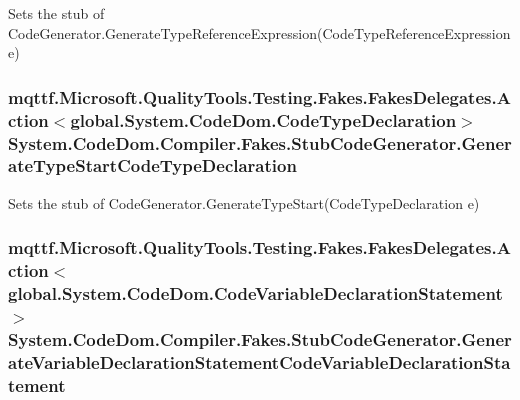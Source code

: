 Sets the stub of Code\-Generator.\-Generate\-Type\-Reference\-Expression(\-Code\-Type\-Reference\-Expression e)

\hypertarget{class_system_1_1_code_dom_1_1_compiler_1_1_fakes_1_1_stub_code_generator_a1ffd340fef2f92f6b9f8f59b7199e064}{
\subsubsection[{Generate\-Type\-Start\-Code\-Type\-Declaration}]{\setlength{\rightskip}{0pt plus 5cm}mqttf.\-Microsoft.\-Quality\-Tools.\-Testing.\-Fakes.\-Fakes\-Delegates.\-Action$<$global.\-System.\-Code\-Dom.\-Code\-Type\-Declaration$>$ System.\-Code\-Dom.\-Compiler.\-Fakes.\-Stub\-Code\-Generator.\-Generate\-Type\-Start\-Code\-Type\-Declaration}}\label{class_system_1_1_code_dom_1_1_compiler_1_1_fakes_1_1_stub_code_generator_a1ffd340fef2f92f6b9f8f59b7199e064}


Sets the stub of Code\-Generator.\-Generate\-Type\-Start(\-Code\-Type\-Declaration e)

\hypertarget{class_system_1_1_code_dom_1_1_compiler_1_1_fakes_1_1_stub_code_generator_a24e7bc0b0bf6d3c04b8db53d43e069d6}{
\subsubsection[{Generate\-Variable\-Declaration\-Statement\-Code\-Variable\-Declaration\-Statement}]{\setlength{\rightskip}{0pt plus 5cm}mqttf.\-Microsoft.\-Quality\-Tools.\-Testing.\-Fakes.\-Fakes\-Delegates.\-Action$<$global.\-System.\-Code\-Dom.\-Code\-Variable\-Declaration\-Statement$>$ System.\-Code\-Dom.\-Compiler.\-Fakes.\-Stub\-Code\-Generator.\-Generate\-Variable\-Declaration\-Statement\-Code\-Variable\-Declaration\-Statement}}\label{class_system_1_1_code_dom_1_1_compiler_1_1_fakes_1_1_stub_code_generator_a24e7bc0b0bf6d3c04b8db53d43e069d6}


